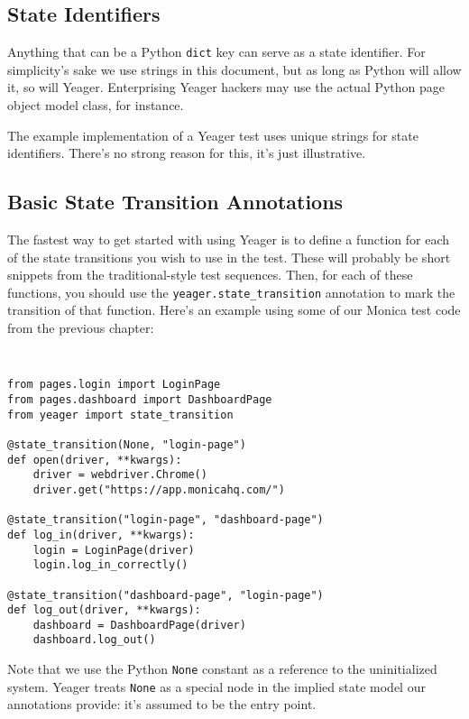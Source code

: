 \subsection{State Identifiers}
Anything that can be a Python \texttt{dict} key can serve as a state identifier. For simplicity's sake we use strings in this document, but as long as Python will allow it, so will Yeager. Enterprising Yeager hackers may use the actual Python page object model class, for instance.

The example implementation of a Yeager test uses unique strings for state identifiers. There's no strong reason for this, it's just illustrative.

\subsection{Basic State Transition Annotations}
The fastest way to get started with using Yeager is to define a function for each of the state transitions you wish to use in the test. These will probably be short snippets from the traditional-style test sequences. Then, for each of these functions, you should use the \texttt{yeager.state\_transition} annotation to mark the transition of that function. Here's an example using some of our Monica test code from the previous chapter:

{\tt
\begin{verbatim}
from pages.login import LoginPage
from pages.dashboard import DashboardPage
from yeager import state_transition

@state_transition(None, "login-page")
def open(driver, **kwargs):
    driver = webdriver.Chrome()
    driver.get("https://app.monicahq.com/")

@state_transition("login-page", "dashboard-page")
def log_in(driver, **kwargs):
    login = LoginPage(driver)
    login.log_in_correctly()

@state_transition("dashboard-page", "login-page")
def log_out(driver, **kwargs):
    dashboard = DashboardPage(driver)
    dashboard.log_out()
\end{verbatim}
}

Note that we use the Python \texttt{None} constant as a reference to the uninitialized system. Yeager treats \texttt{None} as a special node in the implied state model our annotations provide: it's assumed to be the entry point.

